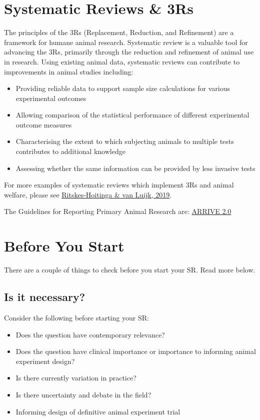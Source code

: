 \documentclass[
]{book}
\providecommand{\tightlist}{%
  \setlength{\itemsep}{0pt}\setlength{\parskip}{0pt}}
\begin{document}
\hypertarget{srs-3rs}{%
\chapter{Systematic Reviews \& 3Rs}\label{srs-3rs}}

The principles of the 3Rs (Replacement, Reduction, and Refinement) are a framework for humane animal research. Systematic review is a valuable tool for advancing the 3Rs, primarily through the reduction and refinement of animal use in research. Using existing animal data, systematic reviews can contribute to improvements in animal studies including:

\begin{itemize}
\tightlist
\item
  Providing reliable data to support sample size calculations for various experimental outcomes
\item
  Allowing comparison of the statistical performance of different experimental outcome measures
\item
  Characterising the extent to which subjecting animals to multiple tests contributes to additional knowledge
\item
  Assessing whether the same information can be provided by less invasive tests
\end{itemize}

For more examples of systematic reviews which implement 3Rs and animal welfare, please see \href{https://www.mdpi.com/2076-2615/9/12/1163/htm}{Ritskes-Hoitinga \& van Luijk, 2019}.

The Guidelines for Reporting Primary Animal Research are: \href{https://journals.plos.org/plosbiology/article?id=10.1371/journal.pbio.3000410}{ARRIVE 2.0}

\hypertarget{b4ustart}{%
\chapter{Before You Start}\label{b4ustart}}

There are a couple of things to check before you start your SR. Read more below.

\hypertarget{is-it-necessary}{%
\section{Is it necessary?}\label{is-it-necessary}}

Consider the following before starting your SR:

\begin{itemize}
\tightlist
\item
  Does the question have contemporary relevance?
\item
  Does the question have clinical importance or importance to informing animal experiment design?
\item
  Is there currently variation in practice?
\item
  Is there uncertainty and debate in the field?
\item
  Informing design of definitive animal experiment trial
\end{itemize}
\end{document}
